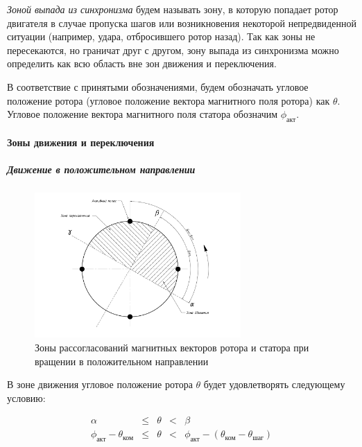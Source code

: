 \textit{Зоной выпада из синхронизма} будем называть зону, в которую попадает ротор
двигателя в случае пропуска шагов или возникновения некоторой непредвиденной ситуации
(например, удара, отбросившего ротор назад). Так как зоны не пересекаются, но граничат
друг с другом, зону выпада из синхронизма можно определить как всю область вне зон
движения и переключения.

В соответствие с принятыми обозначениями, будем обозначать угловое положение
ротора (угловое положение вектора магнитного поля ротора) как $\theta$.
Угловое положение вектора магнитного поля статора обозначим $\phi_\textit{акт}$.

\paragraph{Зоны движения и переключения}
\subparagraph{Движение в положительном направлении}
\begin{figure}
    \centering
    \includegraphics[width=0.7\textwidth, keepaspectratio]
                    {./src/pictures/feedback_control/pole_switch_zones_with_positive_dir}
    \caption{Зоны рассогласований магнитных векторов ротора и статора при вращении в положительном направлении}
    \label{pole_switch_zones_with_positive_dir}
\end{figure}

В зоне движения угловое положение ротора $\theta$ будет удовлетворять следующему условию:

\begin{equation}
    \label{movement_zone_posit_dir_for_curr_pos}
    \begin{array}{ccccc}
        \alpha & \leq & \theta & < & \beta                                         \\
        \phi_\textit{акт} - \theta_\textit{ком}
        & \leq  & \theta
        & <     &\phi_\textit{акт} - (\theta_\textit{ком} - \theta_\textit{шаг})
    \end{array}
\end{equation}


